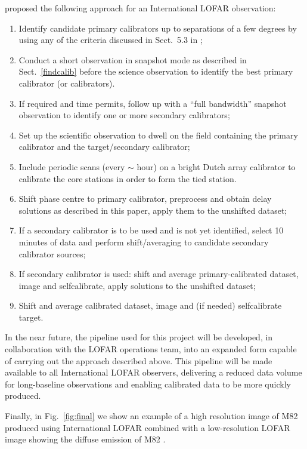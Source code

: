 \documentclass[graybox]{svmult}
\begin{document}
\cite{moldon15} proposed the following approach for an International LOFAR observation: 
\begin{enumerate}
\item Identify candidate primary calibrators up to separations of a few degrees 
    by using any of the criteria discussed in Sect.~5.3 in
    \cite{moldon15};
\item Conduct a short observation in snapshot mode as described
in Sect.~\ref{findcalib} before the science observation to identify
the best primary calibrator (or calibrators).
\item If required and time permits, follow up with a ``full bandwidth'' snapshot observation to 
identify one or more secondary calibrators;
\item Set up the scientific observation to dwell on the field 
containing the primary calibrator and the target/secondary calibrator;
\item Include periodic scans (every $\sim$ hour) on a bright Dutch array 
calibrator to calibrate the core stations in order to form the tied station.
\item Shift phase centre to primary calibrator, preprocess and obtain delay solutions 
as described in this paper, apply them to the unshifted dataset;
\item If a secondary calibrator is to be used and is not yet identified, select 10 minutes
of data and perform shift/averaging to candidate secondary calibrator sources;
\item If secondary calibrator is used: shift and average primary-calibrated dataset, 
image and selfcalibrate, apply solutions to the unshifted dataset;
\item Shift and average calibrated dataset, image and (if needed) selfcalibrate target.
\end{enumerate}

In the near future, the pipeline used for this project will be developed, in
collaboration with the LOFAR operations team, into an expanded form capable of
carrying out the approach described above.  This pipeline will be made available
to all International LOFAR observers, delivering a reduced data volume for
long-baseline observations and enabling calibrated data to be more quickly
produced.

Finally, in Fig.~\ref{fig:final} we show an example of a high resolution image
of M82 produced using International LOFAR combined with a low-resolution LOFAR
image showing the diffuse emission of M82 \cite{varenius15}.
\end{document}
